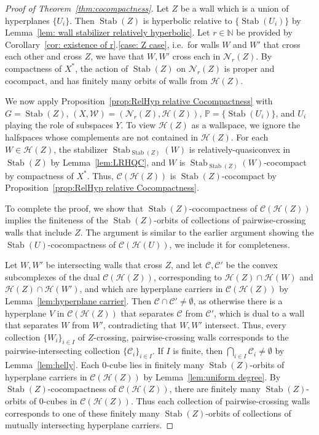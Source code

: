 \documentclass[12pt,oneside]{amsart}
\theoremstyle{definition}
\theoremstyle{definition}
\theoremstyle{remark}
\newcommand{\C}{\mathcal{C}}
\newcommand{\Hem}{\mathcal{H}}
\newcommand{\neb}{\mathcal N}
\DeclareMathOperator{\Stab}{Stab}
\begin{document}
\begin{proof}[Proof of Theorem~\ref{thm:cocompactness}]
Let $Z$ be a wall which is a union of hyperplanes $\{U_i\}$.
Then $\Stab(Z)$ is hyperbolic relative to $\{\Stab(U_i)\}$ by Lemma~\ref{lem: wall stabilizer relatively hyperbolic}.
%
Let $r\in \mathbb N$ be provided by Corollary~\ref{cor: existence of r}.\eqref{case: Z case}, i.e.\ for walls $W$ and $W'$ that cross each other and cross $Z$, we have that $W, W'$ cross each in $\neb_r(Z)$. 
By compactness of $X^*$, the action of $\Stab(Z)$ on $\neb_r(Z)$ is proper and cocompact, and has finitely many orbits of walls from $\Hem(Z)$.

We now apply Proposition~\ref{prop:RelHyp relative Cocompactness} with $G = \Stab(Z)$,  $(X, \mathcal W)=(\neb_r(Z), \Hem(Z))$, $\mathbb{P} = \{\Stab(U_i)\}$, and $U_i$ playing the role of subspaces $Y$.
To view $\Hem(Z)$ as a wallspace, we ignore the halfspaces whose complements are not contained in $\Hem(Z)$. 
For each $W\in \Hem(Z)$, the stabilizer $\Stab_{\Stab(Z)}(W)$ is relatively-quasiconvex in $\Stab(Z)$ by Lemma~\ref{lem:LRHQC}, and $W$ is $\Stab_{\Stab(Z)}(W)$-cocompact by compactness of $X^*$.
Thus, $\C(\Hem(Z))$ is  $\Stab(Z)$-cocompact by Proposition~\ref{prop:RelHyp relative Cocompactness}.

To complete the proof, we show that $\Stab(Z)$-cocompactness of $\C(\Hem(Z))$ implies the finiteness of the $\Stab(Z)$-orbits of collections of pairwise-crossing walls that include $Z$. The argument is similar to the earlier argument showing the $\Stab(U)$-cocompactness of $\C(\Hem(U))$, we include it for completeness.

Let $W, W'$ be intersecting walls that cross $Z$, and let $\C, \C'$ be the convex subcomplexes of the dual $\C(\Hem(Z))$, corresponding to $\Hem(Z)\cap \Hem(W)$ and $\Hem(Z)\cap \Hem(W')$, and  which are hyperplane carriers in $\C(\Hem(Z))$ by Lemma~\ref{lem:hyperplane carrier}. Then $\C\cap \C' \neq \emptyset$, as otherwise there is a hyperplane $V$ in $\C(\Hem(Z))$ that separates $\C$ from $\C'$, which is dual to a wall that separates $W$ from $W'$, contradicting that $W, W'$ intersect. Thus, every collection $\{W_i\}_{i \in I}$ of $Z$-crossing, pairwise-crossing walls corresponds to the pairwise-intersecting collection $\{\C_i\}_{i \in I}$. If $I$ is finite, then $\bigcap_{i
\in I} \C_i \neq \emptyset$ by Lemma~\ref{lem:helly}. 
%
Each $0$-cube lies in finitely many $\Stab(Z)$-orbits of hyperplane carriers in $\C(\Hem(Z))$ by Lemma~\ref{lem:uniform degree}.  By $\Stab(Z)$-cocompactness of $\C(\Hem(Z))$, there are finitely many $\Stab(Z)$-orbits of $0$-cubes in $\C(\Hem(Z))$. Thus each collection of pairwise-crossing walls corresponds to one of these finitely many $\Stab(Z)$-orbits of collections of mutually intersecting hyperplane carriers.
\end{proof}




\end{document}
